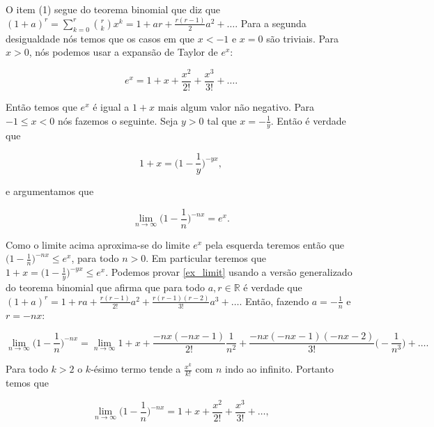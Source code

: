 O item (1) segue do teorema binomial que diz que $(1 + a)^{r} = \sum_{k = 0}^{r} \binom{r}{k} x^{k} = 1 + ar + \frac{r(r - 1)}{2}a^{2} + \dots$. Para a segunda desigualdade nós temos que os casos em que $x < -1$ e $x = 0$ são triviais. Para $x > 0$, nós podemos usar a expansão de Taylor de $e^{x}$:

\begin{equation} \label{taylor_expansion_ex}
    e^{x} = 1 + x + \frac{x^{2}}{2!} + \frac{x^{3}}{3!} + \dots.
\end{equation}

Então temos que $e^{x}$ é igual a $1 + x$ mais algum valor não negativo. Para $-1 \leq x < 0$ nós fazemos o seguinte. Seja $y > 0$ tal que $x = -\frac{1}{y}$. Então é verdade que

\begin{equation*}
   1 + x =  \bigg( 1 - \frac{1}{y} \bigg)^{-yx},
\end{equation*}

e argumentamos que

\begin{equation} \label{ex_limit}
    \lim_{n \to \infty} \bigg( 1 - \frac{1}{n} \bigg)^{-nx} = e^{x}.
\end{equation}

Como o limite acima aproxima-se do limite $e^{x}$ pela esquerda teremos então que $\bigg( 1 - \frac{1}{n} \bigg)^{-nx} \leq e^{x}$, para todo $n > 0$. Em particular teremos que $1 + x = \bigg( 1 - \frac{1}{y} \bigg)^{-yx} \leq e^{x}$. Podemos provar \ref{ex_limit} usando a versão generalizado do teorema binomial que afirma que para todo $a, r \in \mathbb{R}$ é verdade que $(1 + a)^{r} = 1 + ra + \frac{r(r - 1)}{2!}a^{2} + \frac{r(r - 1)(r - 2)}{3!}a^{3} + \dots$. Então, fazendo $a = -\frac{1}{n}$ e $r = -nx$:

\begin{equation*}
    \lim_{n \to \infty} \bigg( 1 - \frac{1}{n} \bigg)^{-nx} = \lim_{n \to \infty} 1 + x + \frac{-nx(-nx - 1)}{2!}\frac{1}{n^{2}} + \frac{-nx(-nx - 1)(-nx - 2)}{3!} \bigg( -\frac{1}{n^{3}} \bigg) + \dots.
\end{equation*}

Para todo $k > 2$ o $k$-ésimo termo tende a $\frac{x^{k}}{k!}$ com $n$ indo ao infinito. Portanto temos que

\begin{equation*}
 \lim_{n \to \infty} \bigg( 1 - \frac{1}{n} \bigg)^{-nx} = 1 + x + \frac{x^{2}}{2!} + \frac{x^{3}}{3!} + \dots,
\end{equation*}


